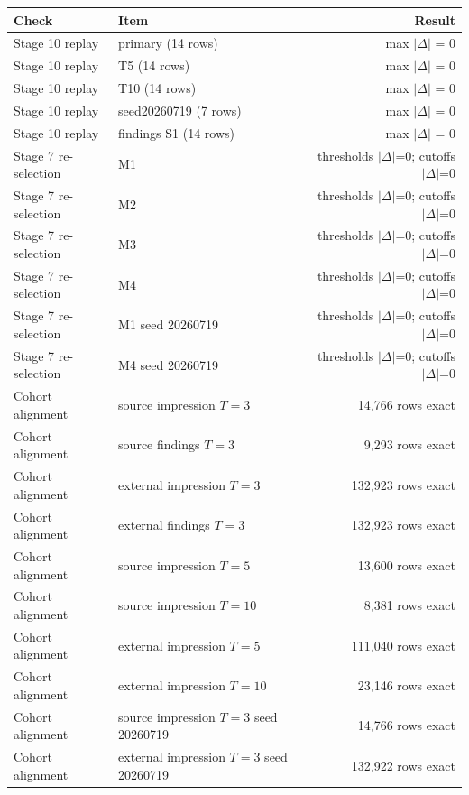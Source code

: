 \begin{tabular}{llr}
\toprule
Check & Item & Result\\
\midrule
Stage 10 replay & primary (14 rows) & max $|\Delta|$ = 0\\
Stage 10 replay & T5 (14 rows) & max $|\Delta|$ = 0\\
Stage 10 replay & T10 (14 rows) & max $|\Delta|$ = 0\\
Stage 10 replay & seed20260719 (7 rows) & max $|\Delta|$ = 0\\
Stage 10 replay & findings S1 (14 rows) & max $|\Delta|$ = 0\\
Stage 7 re-selection & M1 & thresholds $|\Delta|$=0; cutoffs $|\Delta|$=0\\
Stage 7 re-selection & M2 & thresholds $|\Delta|$=0; cutoffs $|\Delta|$=0\\
Stage 7 re-selection & M3 & thresholds $|\Delta|$=0; cutoffs $|\Delta|$=0\\
Stage 7 re-selection & M4 & thresholds $|\Delta|$=0; cutoffs $|\Delta|$=0\\
Stage 7 re-selection & M1 seed 20260719 & thresholds $|\Delta|$=0; cutoffs $|\Delta|$=0\\
Stage 7 re-selection & M4 seed 20260719 & thresholds $|\Delta|$=0; cutoffs $|\Delta|$=0\\
Cohort alignment & source impression $T=3$ & 14,766 rows exact\\
Cohort alignment & source findings $T=3$ & 9,293 rows exact\\
Cohort alignment & external impression $T=3$ & 132,923 rows exact\\
Cohort alignment & external findings $T=3$ & 132,923 rows exact\\
Cohort alignment & source impression $T=5$ & 13,600 rows exact\\
Cohort alignment & source impression $T=10$ & 8,381 rows exact\\
Cohort alignment & external impression $T=5$ & 111,040 rows exact\\
Cohort alignment & external impression $T=10$ & 23,146 rows exact\\
Cohort alignment & source impression $T=3$ seed 20260719 & 14,766 rows exact\\
Cohort alignment & external impression $T=3$ seed 20260719 & 132,922 rows exact\\
\bottomrule
\end{tabular}
